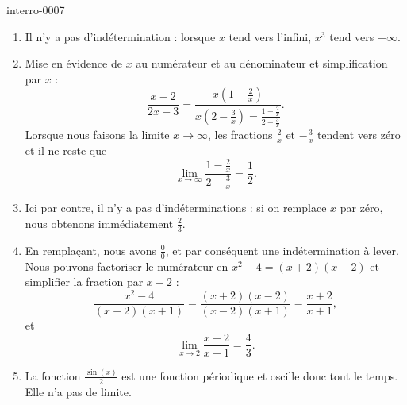 
\begin{corrige}{interro-0007}

	\begin{enumerate}
		\item
			Il n'y a pas d'indétermination : lorsque $x$ tend vers l'infini, $x^3$ tend vers $-\infty$.
		\item
			Mise en évidence de $x$ au numérateur et au dénominateur et simplification par $x$ :
			\begin{equation}
				\frac{ x-2 }{ 2x-3 }=\frac{ x\left( 1-\frac{ 2 }{ x } \right) }{ x\left( 2-\frac{ 3 }{ x } \right)=\frac{ 1-\frac{ 2 }{ x } }{ 2-\frac{ 3 }{ x } } }.
			\end{equation}
			Lorsque nous faisons la limite $x\to \infty$, les fractions $\frac{ 2 }{ x }$ et $-\frac{ 3 }{ x }$ tendent vers zéro et il ne reste que
			\begin{equation}
				\lim_{x\to \infty} \frac{ 1-\frac{ 2 }{ x } }{ 2-\frac{ 3 }{ x } }=\frac{ 1 }{2}.
			\end{equation}
		\item
			Ici par contre, il n'y a pas d'indéterminations : si on remplace $x$ par zéro, nous obtenons immédiatement $\frac{ 2 }{ 3 }$.
		\item
			En remplaçant, nous avons $\frac{ 0 }{ 0 }$, et par conséquent une indétermination à lever. Nous pouvons factoriser le numérateur en $x^2-4=(x+2)(x-2)$ et simplifier la fraction par $x-2$ :
			\begin{equation}
				\frac{ x^2-4 }{ (x-2)(x+1) }=\frac{ (x+2)(x-2) }{ (x-2)(x+1) }=\frac{ x+2 }{ x+1 },
			\end{equation}
			et
			\begin{equation}
				\lim_{x\to 2} \frac{ x+2 }{ x+1 }=\frac{ 4 }{ 3 }.
			\end{equation}
		\item
			La fonction $\frac{ \sin(x) }{2}$ est une fonction périodique et oscille donc tout le temps. Elle n'a pas de limite.
	\end{enumerate}

\end{corrige}
